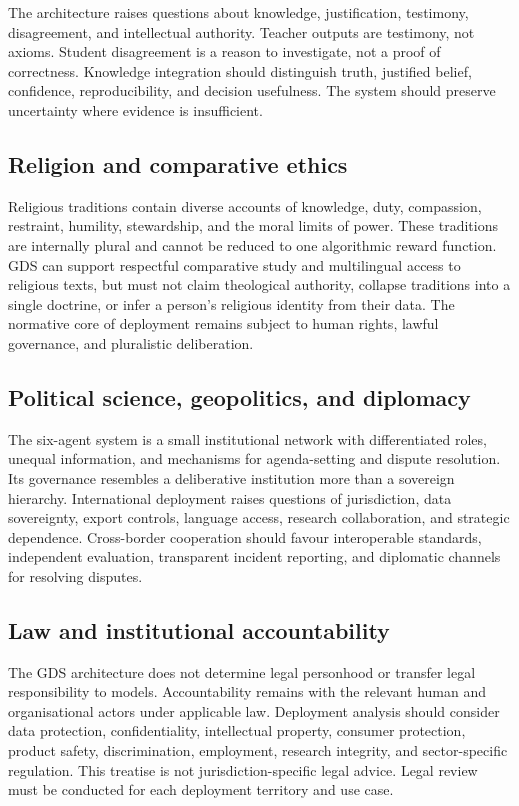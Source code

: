 \documentclass[11pt,a4paper]{article}
\begin{document}
The architecture raises questions about knowledge, justification, testimony, disagreement, and intellectual authority. Teacher outputs are testimony, not axioms. Student disagreement is a reason to investigate, not a proof of correctness. Knowledge integration should distinguish truth, justified belief, confidence, reproducibility, and decision usefulness. The system should preserve uncertainty where evidence is insufficient.

\subsection{Religion and comparative ethics}

Religious traditions contain diverse accounts of knowledge, duty, compassion, restraint, humility, stewardship, and the moral limits of power. These traditions are internally plural and cannot be reduced to one algorithmic reward function. GDS can support respectful comparative study and multilingual access to religious texts, but must not claim theological authority, collapse traditions into a single doctrine, or infer a person's religious identity from their data. The normative core of deployment remains subject to human rights, lawful governance, and pluralistic deliberation.

\subsection{Political science, geopolitics, and diplomacy}

The six-agent system is a small institutional network with differentiated roles, unequal information, and mechanisms for agenda-setting and dispute resolution. Its governance resembles a deliberative institution more than a sovereign hierarchy. International deployment raises questions of jurisdiction, data sovereignty, export controls, language access, research collaboration, and strategic dependence. Cross-border cooperation should favour interoperable standards, independent evaluation, transparent incident reporting, and diplomatic channels for resolving disputes.

\subsection{Law and institutional accountability}

The GDS architecture does not determine legal personhood or transfer legal responsibility to models. Accountability remains with the relevant human and organisational actors under applicable law. Deployment analysis should consider data protection, confidentiality, intellectual property, consumer protection, product safety, discrimination, employment, research integrity, and sector-specific regulation. This treatise is not jurisdiction-specific legal advice. Legal review must be conducted for each deployment territory and use case.
\end{document}

